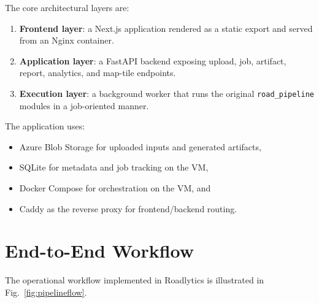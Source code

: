\documentclass[conference]{IEEEtran}
\begin{document}
The core architectural layers are:

\begin{enumerate}[leftmargin=16pt]
\item \textbf{Frontend layer}: a Next.js application rendered as a static export
and served from an Nginx container.
\item \textbf{Application layer}: a FastAPI backend exposing upload, job,
artifact, report, analytics, and map-tile endpoints.
\item \textbf{Execution layer}: a background worker that runs the original
\texttt{road\_pipeline} modules in a job-oriented manner.
\end{enumerate}

The application uses:

\begin{itemize}[leftmargin=16pt]
\item Azure Blob Storage for uploaded inputs and generated artifacts,
\item SQLite for metadata and job tracking on the VM,
\item Docker Compose for orchestration on the VM, and
\item Caddy as the reverse proxy for frontend/backend routing.
\end{itemize}

\section{End-to-End Workflow}
The operational workflow implemented in Roadlytics is illustrated in
Fig.~\ref{fig:pipelineflow}.
\end{document}
